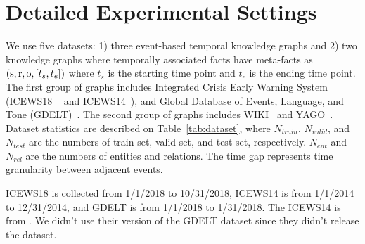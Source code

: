 



\section{Detailed Experimental Settings}
\label{append:base}

\label{append:dataset}
We use five datasets: 1) three event-based temporal knowledge graphs and 2) two knowledge graphs where temporally associated facts have meta-facts as $(\mathrm{s},\mathrm{r},\mathrm{o}, [t_s, t_e])$ where $t_s$ is the starting time point and $t_e$ is the ending time point. 
The first group of graphs includes Integrated Crisis Early Warning System (ICEWS18 ~\citep{boschee2015icews} and ICEWS14~\citep{Trivedi2017KnowEvolveDT}), and Global Database of Events, Language, and Tone (GDELT)~\citep{leetaru2013gdelt}.
The second group of graphs includes WIKI~\citep{leblay2018deriving} and YAGO~\citep{Mahdisoltani2014YAGO3AK}.
Dataset statistics are described on Table~\ref{tab:dataset}, where $N_{train}$, $N_{valid}$, and $N_{test}$ are the numbers of train set, valid set, and test set, respectively. $N_{ent}$ and $N_{rel}$ are the numbers of entities and relations. The time gap represents time granularity between adjacent events. 


ICEWS18 is collected from 1/1/2018 to 10/31/2018, ICEWS14 is from 1/1/2014 to 12/31/2014, and GDELT is from 1/1/2018 to 1/31/2018.
The ICEWS14 is from \citep{Trivedi2017KnowEvolveDT}. We didn't use their version of the GDELT dataset since they didn't release the dataset.




